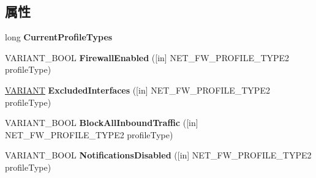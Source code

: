 \subsection*{属性}
\begin{DoxyCompactItemize}
\item 
\mbox{\label{interface_i_net_fw_policy2_ac5f8a56ba5ce7c68f562854b109ccca5}} 
long {\bfseries Current\+Profile\+Types}
\item 
\mbox{\label{interface_i_net_fw_policy2_a0fd711ad08457064505e7978abdb61d9}} 
V\+A\+R\+I\+A\+N\+T\+\_\+\+B\+O\+OL {\bfseries Firewall\+Enabled} (\mbox{[}in\mbox{]} N\+E\+T\+\_\+\+F\+W\+\_\+\+P\+R\+O\+F\+I\+L\+E\+\_\+\+T\+Y\+P\+E2 profile\+Type)
\item 
\mbox{\label{interface_i_net_fw_policy2_af552fa68c6cdd89fc41f61885701e25c}} 
\hyperlink{structtag_v_a_r_i_a_n_t}{V\+A\+R\+I\+A\+NT} {\bfseries Excluded\+Interfaces} (\mbox{[}in\mbox{]} N\+E\+T\+\_\+\+F\+W\+\_\+\+P\+R\+O\+F\+I\+L\+E\+\_\+\+T\+Y\+P\+E2 profile\+Type)
\item 
\mbox{\label{interface_i_net_fw_policy2_a9963d4f4e80e38d598454a4232572371}} 
V\+A\+R\+I\+A\+N\+T\+\_\+\+B\+O\+OL {\bfseries Block\+All\+Inbound\+Traffic} (\mbox{[}in\mbox{]} N\+E\+T\+\_\+\+F\+W\+\_\+\+P\+R\+O\+F\+I\+L\+E\+\_\+\+T\+Y\+P\+E2 profile\+Type)
\item 
\mbox{\label{interface_i_net_fw_policy2_a7151e28742f5d6455a5840e532308a74}} 
V\+A\+R\+I\+A\+N\+T\+\_\+\+B\+O\+OL {\bfseries Notifications\+Disabled} (\mbox{[}in\mbox{]} N\+E\+T\+\_\+\+F\+W\+\_\+\+P\+R\+O\+F\+I\+L\+E\+\_\+\+T\+Y\+P\+E2 profile\+Type)
\item 
\mbox{\label{interface_i_net_fw_policy2_a5bc5b9706966498543d1eef35f6a1419}} 

\end{DoxyCompactItemize}
